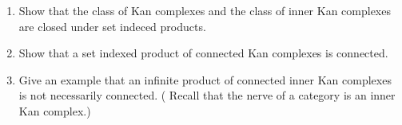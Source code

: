 \begin{Exercise}
    \begin{enumerate}[label=(\alph*)]
        \item 
        Show that the class of Kan complexes and the class of inner Kan complexes are closed under set indeced products.
    
        \item 
        Show that a set indexed product of connected Kan complexes is connected.
    
        \item 
        Give an example that an infinite product of connected inner Kan complexes is not necessarily connected. 
        ( Recall that the nerve of a category is an inner Kan complex.)
    \end{enumerate}
\end{Exercise}